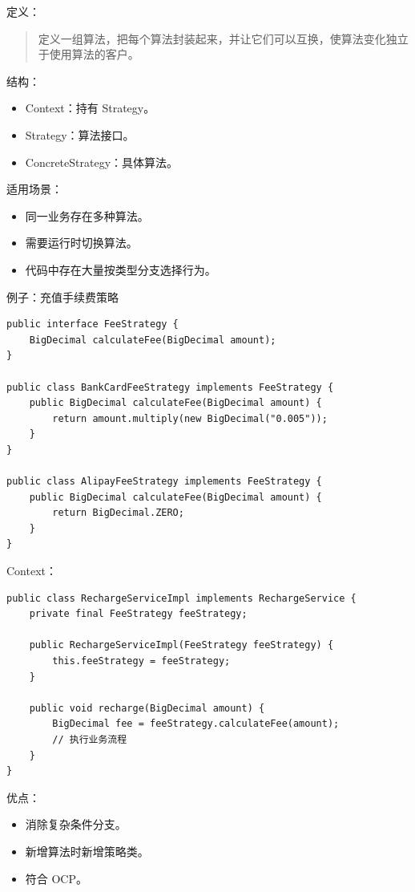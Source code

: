 \documentclass[UTF8,zihao=-4]{ctexart}
\begin{document}
定义：

\begin{quote}
定义一组算法，把每个算法封装起来，并让它们可以互换，使算法变化独立于使用算法的客户。
\end{quote}

结构：

\begin{itemize}
\item Context：持有 Strategy。
\item Strategy：算法接口。
\item ConcreteStrategy：具体算法。
\end{itemize}

适用场景：

\begin{itemize}
\item 同一业务存在多种算法。
\item 需要运行时切换算法。
\item 代码中存在大量按类型分支选择行为。
\end{itemize}

例子：充值手续费策略

\small
\begin{verbatim}
public interface FeeStrategy {
    BigDecimal calculateFee(BigDecimal amount);
}

public class BankCardFeeStrategy implements FeeStrategy {
    public BigDecimal calculateFee(BigDecimal amount) {
        return amount.multiply(new BigDecimal("0.005"));
    }
}

public class AlipayFeeStrategy implements FeeStrategy {
    public BigDecimal calculateFee(BigDecimal amount) {
        return BigDecimal.ZERO;
    }
}
\end{verbatim}
\normalsize

Context：

\small
\begin{verbatim}
public class RechargeServiceImpl implements RechargeService {
    private final FeeStrategy feeStrategy;

    public RechargeServiceImpl(FeeStrategy feeStrategy) {
        this.feeStrategy = feeStrategy;
    }

    public void recharge(BigDecimal amount) {
        BigDecimal fee = feeStrategy.calculateFee(amount);
        // 执行业务流程
    }
}
\end{verbatim}
\normalsize

优点：

\begin{itemize}
\item 消除复杂条件分支。
\item 新增算法时新增策略类。
\item 符合 OCP。
\end{itemize}
\end{document}
